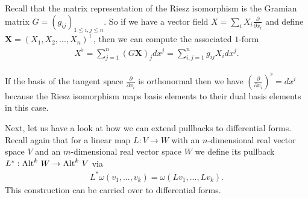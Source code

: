 \documentclass[../master_thesis.tex]{subfiles}
\begin{document}
Recall that the matrix representation of the Riesz isomorphism is the 
Gramian matrix $G = (g_{ij})_{1\leq i,j \leq n} $. So if we have a vector field 
$X = \sum_i X_i \frac{\partial}{\partial x_i}$ and define 
$\mathbf{X} = (X_1, X_2, ..., X_n)^\top$, then we can compute the 
associated $1$-form 
\begin{align*}
    X^\flat = \sum_{j=1}^n (G \mathbf{X})_j dx^j 
    = \sum_{i,j=1}^n g_{ij} X_i dx^j.
\end{align*}

If the basis of the tangent space $\frac{\partial}{\partial x_i}$ is 
orthonormal then we have $(\frac{\partial}{\partial x_i})^\flat = dx^i$ 
because the Riesz isomorphism maps basis elements to their dual basis elements
in this case.

Next, let us have a look at how we can extend pullbacks to differential forms.
Recall again that for a linear map $L: V \rightarrow W$ with an 
$n$-dimensional real vector space $V$ and an 
$m$-dimensional real vector space $W$ we define its pullback 
$L^*: {\operatorname{Alt}^{k}\,W} \rightarrow {\operatorname{Alt}^{k}\,V}$ via 
\begin{align*}
    L^*\omega (v_1, ..., v_k) = \omega (Lv_1, ..., L v_k).
\end{align*} 
This construction can be carried over to differential forms.
\end{document}
